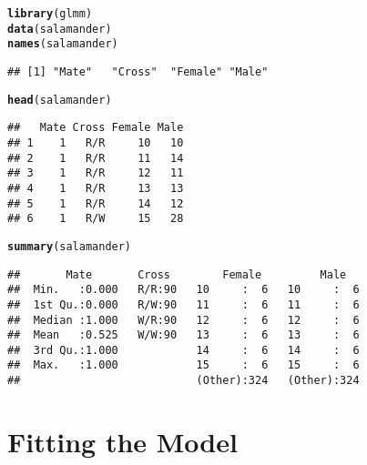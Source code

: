 \documentclass[11pt]{article}\usepackage[]{graphicx}\usepackage[]{color}
\makeatletter
\newcommand{\hlstd}[1]{\textcolor[rgb]{0.345,0.345,0.345}{#1}}%
\newcommand{\hlkwd}[1]{\textcolor[rgb]{0.737,0.353,0.396}{\textbf{#1}}}%
\newenvironment{kframe}{%
 \def\at@end@of@kframe{}%
 \ifinner\ifhmode%
  \def\at@end@of@kframe{\end{minipage}}%
  \begin{minipage}{\columnwidth}%
 \fi\fi%
 \def\FrameCommand##1{\hskip\@totalleftmargin \hskip-\fboxsep
 \colorbox{shadecolor}{##1}\hskip-\fboxsep
     \hskip-\linewidth \hskip-\@totalleftmargin \hskip\columnwidth}%
 \MakeFramed {\advance\hsize-\width
   \@totalleftmargin\z@ \linewidth\hsize
   \@setminipage}}%
 {\par\unskip\endMakeFramed%
 \at@end@of@kframe}
\newenvironment{knitrout}{}{} %
\makeatother
\begin{document}
\begin{knitrout}
\color{fgcolor}\begin{kframe}
\begin{alltt}
\hlkwd{library}\hlstd{(glmm)}
\hlkwd{data}\hlstd{(salamander)}
\hlkwd{names}\hlstd{(salamander)}
\end{alltt}
\begin{verbatim}
## [1] "Mate"   "Cross"  "Female" "Male"
\end{verbatim}
\begin{alltt}
\hlkwd{head}\hlstd{(salamander)}
\end{alltt}
\begin{verbatim}
##   Mate Cross Female Male
## 1    1   R/R     10   10
## 2    1   R/R     11   14
## 3    1   R/R     12   11
## 4    1   R/R     13   13
## 5    1   R/R     14   12
## 6    1   R/W     15   28
\end{verbatim}
\begin{alltt}
\hlkwd{summary}\hlstd{(salamander)}
\end{alltt}
\begin{verbatim}
##       Mate       Cross        Female         Male    
##  Min.   :0.000   R/R:90   10     :  6   10     :  6  
##  1st Qu.:0.000   R/W:90   11     :  6   11     :  6  
##  Median :1.000   W/R:90   12     :  6   12     :  6  
##  Mean   :0.525   W/W:90   13     :  6   13     :  6  
##  3rd Qu.:1.000            14     :  6   14     :  6  
##  Max.   :1.000            15     :  6   15     :  6  
##                           (Other):324   (Other):324
\end{verbatim}
\end{kframe}
\end{knitrout}



\section{Fitting the Model}\label{sec:fitmod}
\end{document}
